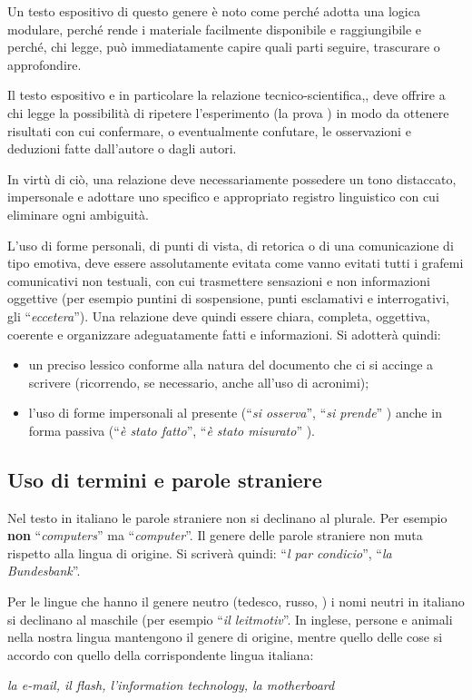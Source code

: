 Un testo espositivo di questo genere è noto come  perché adotta una logica modulare, perché rende i materiale facilmente disponibile e raggiungibile e perché, chi legge, può immediatamente capire quali parti seguire, trascurare o approfondire.

Il testo espositivo e in particolare la relazione tecnico-scientifica,, deve offrire a chi legge la possibilità di ripetere l'esperimento (la prova \ecc) in modo da ottenere risultati con cui confermare, o eventualmente confutare, le osservazioni e deduzioni fatte dall'autore o dagli autori.

In virtù di ciò, una relazione deve necessariamente possedere un tono distaccato, impersonale e adottare uno specifico e appropriato registro linguistico con cui eliminare ogni ambiguità.

L'uso di forme personali, di punti di vista, di retorica o di una comunicazione di tipo emotiva, deve essere assolutamente evitata come vanno evitati tutti i grafemi comunicativi non testuali, con cui trasmettere sensazioni e non informazioni oggettive (per esempio puntini di sospensione, punti esclamativi e interrogativi, gli ``\textit{eccetera}''). Una relazione deve quindi essere chiara, completa, oggettiva, coerente e organizzare adeguatamente fatti e informazioni. Si adotterà quindi:
\begin{itemize}
 \item un preciso lessico conforme alla natura del documento che ci si accinge a scrivere (ricorrendo, se necessario, anche all'uso di acronimi);
 \item l'uso di forme impersonali al presente (``\textit{si osserva}'', ``\textit{si prende}'' \ecc) anche in forma passiva (``\textit{è stato fatto}'', ``\textit{è stato misurato}'' \ecc).
\end{itemize}



					\subsection{Uso di termini e parole straniere}

Nel testo in italiano le parole straniere non si declinano al plurale. Per esempio \textbf{non} ``\textit{computers}'' ma ``\textit{computer}''. Il genere delle parole straniere non muta rispetto alla lingua di origine. Si scriverà quindi: ``\textit{l par condicio}'', ``\textit{la Bundesbank}''.

Per le lingue che hanno il genere neutro (tedesco, russo, \ecc) i nomi neutri in italiano si declinano al maschile (per esempio ``\textit{il leitmotiv}''. In inglese, persone e animali nella nostra lingua mantengono il genere di origine, mentre quello delle cose si accordo con quello della corrispondente lingua italiana:
\begin{center}
\textit{la e-mail, il flash, l'information technology, la motherboard}
\end{center}



